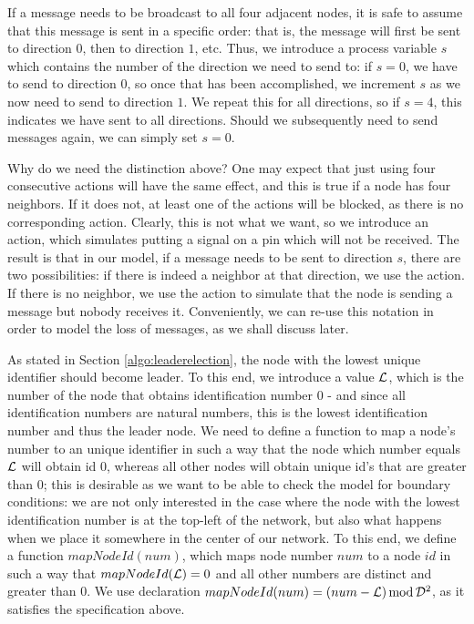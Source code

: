 If a message needs to be broadcast to all four adjacent nodes, it is safe to assume that this message is sent in a specific order: that is, the message will first be sent to direction $0$, then to direction $1$, etc. Thus, we introduce a process variable $s$ which contains the number of the direction we need to send to: if $s = 0$, we have to send to direction $0$, so once that has been accomplished, we increment $s$ as we now need to send to direction $1$. We repeat this for all directions, so if $s = 4$, this indicates we have sent to all directions. Should we subsequently need to send messages again, we can simply set $s = 0$.

Why do we need the distinction above? One may expect that just using four consecutive  actions will have the same effect, and this is true if a node has four neighbors. If it does not, at least one of the  actions will be blocked, as there is no corresponding  action. Clearly, this is not what we want, so we introduce an  action, which simulates putting a signal on a pin which will not be received. The result is that in our model, if a message needs to be sent to direction $s$, there are two possibilities: if there is indeed a neighbor at that direction, we use the  action. If there is no neighbor, we use the  action to simulate that the node is sending a message but nobody receives it. Conveniently, we can re-use this notation in order to model the loss of messages, as we shall discuss later.

As stated in Section \ref{algo:leaderelection}, the node with the lowest unique identifier should become leader. To this end, we introduce a value $\mathcal{L}$, which is the number of the node that obtains identification number $0$ - and since all identification numbers are natural numbers, this is the lowest identification number and thus the leader node. We need to define a function to map a node's number to an unique identifier in such a way that the node which number equals $\mathcal{L}$ will obtain id $0$, whereas all other nodes will obtain unique id's that are greater than $0$; this is desirable as we want to be able to check the model for boundary conditions: we are not only interested in the case where the node with the lowest identification number is at the top-left of the network, but also what happens when we place it somewhere in the center of our network. To this end, we define a function $mapNodeId(num)$, which maps node number $num$ to a node $id$ in such a way that $mapNodeId(\mathcal{L}) = 0$ and all other numbers are distinct and greater than $0$. We use declaration $mapNodeId(num) = (num - \mathcal{L}) \operatorname{mod} \mathcal{D}^2$, as it satisfies the specification above.

